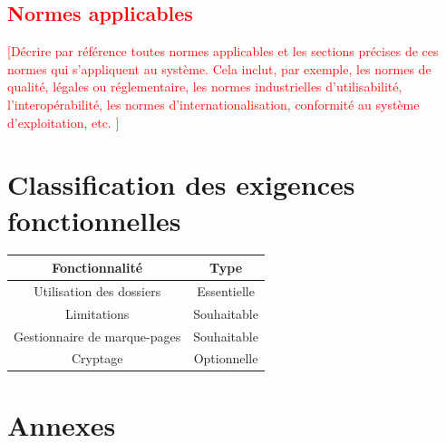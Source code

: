 \documentclass[10pt,a4paper]{report}
\begin{document}
\textcolor{red}{\section{Normes applicables}
[Décrire par référence toutes normes applicables et les sections précises de ces normes qui s’appliquent au système. Cela inclut, par exemple, les normes de qualité, légales ou réglementaire, les normes industrielles d’utilisabilité, l’interopérabilité, les normes d’internationalisation, conformité au système d’exploitation, etc. ]}


\section{Classification des exigences fonctionnelles}
\bgroup
\def\arraystretch{1.5}
\begin{tabular}{|c|c|}
	\hline
	{\large \textbf{Fonctionnalité}} & {\large \textbf{Type}}\\
	\hline
	Utilisation des dossiers & Essentielle\\
	\hline
	Limitations & Souhaitable\\
	\hline
	Gestionnaire de marque-pages & Souhaitable\\
	\hline
	Cryptage & Optionnelle\\
	\hline
\end{tabular}
\egroup


\section{Annexes}
\end{document}
